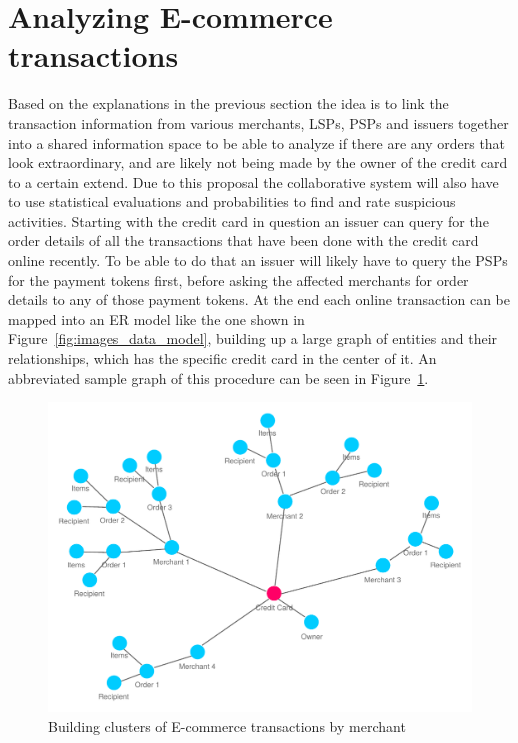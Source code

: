 
\section{Analyzing \gls{E-commerce} transactions}
\label{sec:analyze_transactions}

Based on the explanations in the previous section the idea is to link the transaction information from various merchants, \gls{LSP}s, \gls{PSP}s and issuers together into a shared information space to be able to analyze if there are any orders that look extraordinary, and are likely not being made by the owner of the credit card to a certain extend. Due to this proposal the collaborative system will also have to use statistical evaluations and probabilities to find and rate suspicious activities. Starting with the credit card in question an issuer can query for the order details of all the transactions that have been done with the credit card online recently. To be able to do that an issuer will likely have to query the \gls{PSP}s for the payment tokens first, before asking the affected merchants for order details to any of those payment tokens. At the end each online transaction can be mapped into an \gls{ER} model like the one shown in Figure~\ref{fig:images_data_model}, building up a large graph of entities and their relationships, which has the specific credit card in the center of it. An abbreviated sample graph of this procedure can be seen in Figure~\ref{fig:images_credit_card_graph}. \@

\begin{figure}[H]
  \centering
  \includegraphics[width=0.9\columnwidth]{images/ontology_scenario_2.pdf}
  \caption{Building clusters of E-commerce transactions by merchant}
\label{fig:images_credit_card_graph}
\end{figure}

